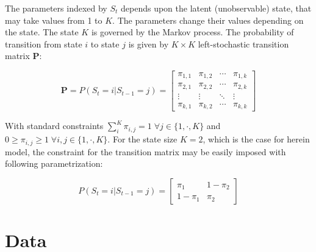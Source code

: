 \documentclass[12pt]{article}
\begin{document}
The parameters indexed by $S_t$ depends upon the latent (unobservable) state, that may take values from 1 to $K$. The parameters change their values depending on the state. The state $K$ is governed by the Markov process. The probability of transition from state $i$ to state $j$ is given by $K \times K$ left-stochastic transition matrix $\mathbf{P}$:

\begin{equation}
	\mathbf{P} = P(S_t = i | S_{t-1} = j) = 
	\begin{bmatrix}
		\pi_{1,1} & \pi_{1,2} & \cdots & \pi_{1,k} \\
		\pi_{2,1} & \pi_{2,2} & \cdots & \pi_{2,k} \\
		\vdots  & \vdots  & \ddots & \vdots  \\
		\pi_{k,1} & \pi_{k,2} & \cdots & \pi_{k,k} 
	\end{bmatrix}
\end{equation}

With standard constraints $\sum_{i}^{K} \pi_{i,j} = 1 \; \forall j \in \{1,\cdot, K\}$ and $0 \geq \pi_{i,j} \geq 1 \; \forall i,j \in \{1,\cdot, K\}$. For the state size $K=2$, which is the case for herein model, the constraint for the transition matrix may be easily imposed with following parametrization:

\begin{equation}
	P(S_t = i | S_{t-1} = j) = \begin{bmatrix}
		\pi_1 & 1 - \pi_2\\
		1 - \pi_1 & \pi_2
	\end{bmatrix}
\end{equation}





\newpage

\appendix

\section{Data}\label{appendix:data}
\end{document}
